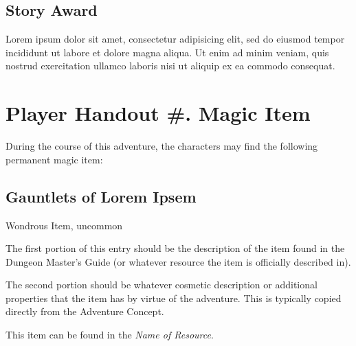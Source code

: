 \subsection{Story Award}\label{story-award}

Lorem ipsum dolor sit amet, consectetur adipisicing elit, sed do eiusmod
tempor incididunt ut labore et dolore magna aliqua. Ut enim ad minim
veniam, quis nostrud exercitation ullamco laboris nisi ut aliquip ex ea
commodo consequat.

\section{Player Handout \#. Magic
Item}\label{player-handout-.-magic-item}

During the course of this adventure, the characters may find the
following permanent magic item:

\subsection{Gauntlets of Lorem Ipsem}\label{gauntlets-of-lorem-ipsem-1}

Wondrous Item, uncommon

The first portion of this entry should be the description of the item
found in the Dungeon Master's Guide (or whatever resource the item is
officially described in).

The second portion should be whatever cosmetic description or additional
properties that the item has by virtue of the adventure. This is
typically copied directly from the Adventure Concept.

This item can be found in the \emph{Name of Resource}.
